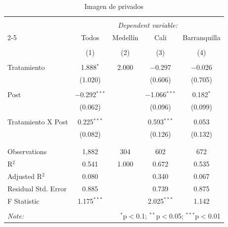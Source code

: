 
\begin{table}[H] \centering 
  \caption{Imagen de privados} 
  \label{reg_entorno} 
\tiny 
\begin{tabular}{@{\extracolsep{-7pt}}lcccc} 
\\[-1.8ex]\hline 
\hline \\[-1.8ex] 
 & \multicolumn{4}{c}{\textit{Dependent variable:}} \\ 
\cline{2-5} 
 & Todos & Medellín & Cali & Barranquilla \\ 
\\[-1.8ex] & (1) & (2) & (3) & (4)\\ 
\hline \\[-1.8ex] 
 Tratamiento & 1.888$^{*}$ & 2.000 & $-$0.297 & $-$0.026 \\ 
  & (1.020) &  & (0.606) & (0.705) \\ 
  & & & & \\ 
 Post & $-$0.292$^{***}$ &  & $-$1.066$^{***}$ & 0.182$^{*}$ \\ 
  & (0.062) &  & (0.096) & (0.099) \\ 
  & & & & \\ 
 Tratamiento X Post & 0.225$^{***}$ &  & 0.593$^{***}$ & 0.053 \\ 
  & (0.082) &  & (0.126) & (0.132) \\ 
  & & & & \\ 
\hline \\[-1.8ex] 
Observations & 1,882 & 304 & 602 & 672 \\ 
R$^{2}$ & 0.541 & 1.000 & 0.672 & 0.535 \\ 
Adjusted R$^{2}$ & 0.080 &  & 0.340 & 0.067 \\ 
Residual Std. Error & 0.885 &  & 0.739 & 0.875 \\ 
F Statistic & 1.175$^{***}$ &  & 2.025$^{***}$ & 1.142 \\ 
\hline 
\hline \\[-1.8ex] 
\textit{Note:}  & \multicolumn{4}{r}{$^{*}$p$<$0.1; $^{**}$p$<$0.05; $^{***}$p$<$0.01} \\ 
\end{tabular} 
\end{table} 
